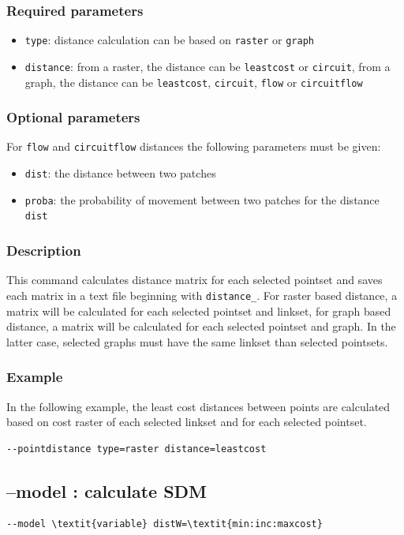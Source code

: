 \documentclass[a4paper,10pt]{report}
\begin{document}
\subsubsection{Required parameters}
\begin{itemize}
	\item \verb|type|: distance calculation can be based on \verb|raster| or \verb|graph|
	\item \verb|distance|: from a raster, the distance can be \verb|leastcost| or \verb|circuit|, from a graph, the distance can be \verb|leastcost|, \verb|circuit|, \verb|flow| or \verb|circuitflow|
\end{itemize}

\subsubsection{Optional parameters}
For \verb|flow| and \verb|circuitflow| distances the following parameters must be given:
\begin{itemize}
	\item \verb|dist|: the distance between two patches
	\item \verb|proba|: the probability of movement between two patches for the distance \verb|dist|
\end{itemize}

\subsubsection{Description}
This command calculates distance matrix for each selected pointset and saves each matrix in a text file beginning with \verb|distance_|.
For raster based distance, a matrix will be calculated for each selected pointset and linkset, for graph based distance, a matrix will be calculated for each selected pointset and graph. In the latter case, selected graphs must have the same linkset than selected pointsets.

\subsubsection{Example}
In the following example, the least cost distances between points are calculated based on cost raster of each selected linkset and for each selected pointset.
\begin{Verbatim}
--pointdistance type=raster distance=leastcost
\end{Verbatim}


\subsection{--model : calculate SDM}
\begin{Verbatim}[commandchars=\\\{\}]
--model \textit{variable} distW=\textit{min:inc:maxcost}
\end{Verbatim}
\end{document}
